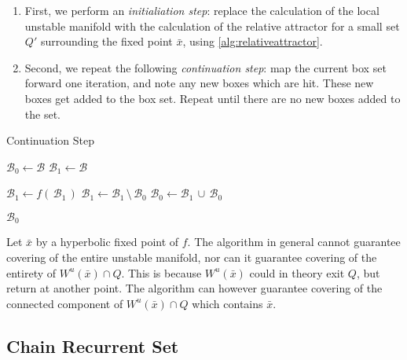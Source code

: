 \begin{enumerate}
    \item First, we perform an \emph{initialiation step}: replace the calculation of 
    the local unstable manifold with the calculation of the relative
    attractor for a small set $Q'$ surrounding the fixed point $\bar{x}$, using 
    \autoref{alg:relativeattractor}. 
    \item Second, we repeat the following \emph{continuation step}: map 
    the current box set forward one iteration, and note any new boxes which are hit. These 
    new boxes get added to the box set. Repeat until there are no new boxes
    added to the set. 
\end{enumerate}

\begin{algorithm}
    \caption{Continuation Step}
    \label{alg:manifold}

    \begin{algorithmic}[1]
        \State $\mathcal{B}_0 \gets \mathcal{B}$
        \State $\mathcal{B}_1 \gets \mathcal{B}$

            \State $\mathcal{B}_1 \gets f(\,\mathcal{B}_1\,)$
            \label{alg:manifold:map}
            \State $\mathcal{B}_1 \gets \mathcal{B}_1\, \setminus\, \mathcal{B}_0$
            \State $\mathcal{B}_0 \gets \mathcal{B}_1\, \cup\, \mathcal{B}_0$
        \EndWhile

        \State \Return $\mathcal{B}_0$
    \end{algorithmic}
\end{algorithm}

\begin{proposition}
    \cite*{manifold} Let $\bar{x}$ by a hyperbolic fixed point of $f$.
    The algorithm in general cannot guarantee covering of the 
    entire unstable manifold, nor can it guarantee covering of the entirety of 
    $W^u(\bar{x}) \cap Q$. This is because $W^u(\bar{x})$ could in theory exit $Q$, 
    but return at another point. The algorithm can however guarantee covering 
    of the connected component of $W^u(\bar{x}) \cap Q$ which contains $\bar{x}$.
\end{proposition}
    

\subsection{Chain Recurrent Set}

